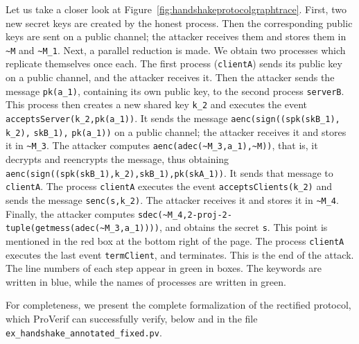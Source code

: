 \documentclass{book}
\begin{document}
Let us take a closer look at Figure~\ref{fig:handshakeprotocolgraphtrace}. First, two new secret keys are created by the honest process. Then the corresponding public keys are sent on a public channel; the attacker receives them and stores them in \lstinline!~M! and \lstinline!~M_1!. Next, a parallel reduction is made. We obtain two processes which replicate themselves once each. The first process (\lstinline!clientA!) sends its public key on a public channel, and the attacker receives it. Then the attacker sends the message \lstinline!pk(a_1)!, containing its own public key, to the second process \lstinline!serverB!. This process then creates a new shared key \lstinline!k_2! and executes the event  \lstinline!acceptsServer(k_2,pk(a_1))!. It sends the message \lstinline!aenc(sign((spk(skB_1),! \lstinline!k_2),! \lstinline!skB_1),! \lstinline!pk(a_1))! on a public channel; the attacker receives it and stores it in \lstinline!~M_3!. The attacker computes \lstinline!aenc(adec(~M_3,a_1),~M))!, that is, it decrypts and reencrypts the message, thus obtaining \lstinline!aenc(sign((spk(skB_1),k_2),skB_1),pk(skA_1))!. It sends that message to \lstinline!clientA!. The process \lstinline!clientA! executes the event \lstinline!acceptsClients(k_2)! and sends the message \lstinline!senc(s,k_2)!. The attacker receives it and stores it in \lstinline!~M_4!. Finally, the attacker computes \lstinline!sdec(~M_4,2-proj-2-tuple(getmess(adec(~M_3,a_1))))!, and obtains the secret \lstinline!s!. This point is mentioned in the red box at the bottom right of the page. The process \lstinline!clientA! executes the last event \lstinline!termClient!, and terminates. This is the end of the attack. The line numbers of each step appear in green in boxes. The keywords are written in blue, while the names of processes are written in green.





For completeness, we present the complete formalization of the rectified protocol, which ProVerif can successfully verify, below and in the file \texttt{{\docexdir}ex\_handshake\_annotated\_fixed.pv}.



\end{document}
